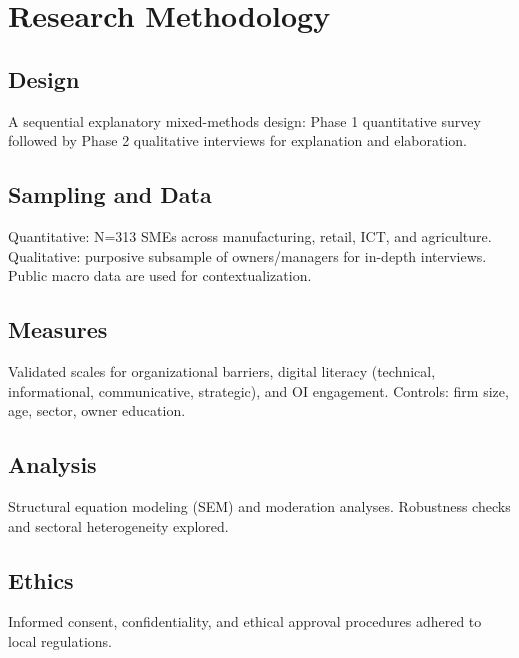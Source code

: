\chapter{Research Methodology}\label{ch:methodology}

\section{Design}
A sequential explanatory mixed-methods design: Phase 1 quantitative survey followed by Phase 2 qualitative interviews for explanation and elaboration.

\section{Sampling and Data}
Quantitative: N=313 SMEs across manufacturing, retail, ICT, and agriculture. Qualitative: purposive subsample of owners/managers for in-depth interviews. Public macro data are used for contextualization.

\section{Measures}
Validated scales for organizational barriers, digital literacy (technical, informational, communicative, strategic), and OI engagement. Controls: firm size, age, sector, owner education.

\section{Analysis}
Structural equation modeling (SEM) and moderation analyses. Robustness checks and sectoral heterogeneity explored.

\section{Ethics}
Informed consent, confidentiality, and ethical approval procedures adhered to local regulations.

